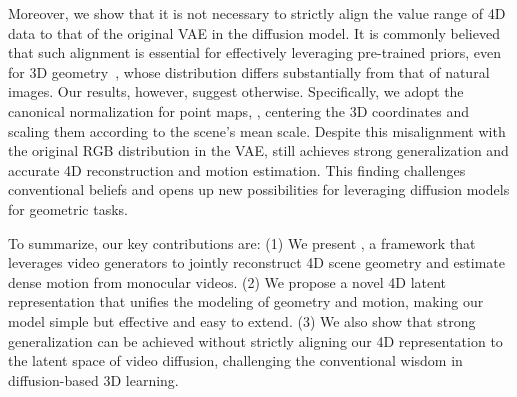 Moreover, we show that it is not necessary to strictly align the value range of 4D data to that of the original VAE in the diffusion model.
It is commonly believed that such alignment is essential for effectively leveraging pre-trained priors,
even for 3D geometry~\cite{ke2024repurposing,zhang2024world,lu2025matrix3d,jiang2025geo4d},
whose distribution differs substantially from that of natural images.
Our results, however, suggest otherwise.
Specifically, we adopt the canonical normalization for point maps,
\ie, centering the 3D coordinates and scaling them according to the scene's mean scale.
Despite this misalignment with the original RGB distribution in the VAE, \method{} still achieves strong generalization and accurate 4D reconstruction and motion estimation.
This finding challenges conventional beliefs and opens up new possibilities for leveraging diffusion models for geometric tasks.

To summarize, our key contributions are:
(1) We present \method,
a framework that leverages video generators to jointly reconstruct 4D scene geometry and estimate dense motion from monocular videos.
(2) We propose a novel 4D latent representation that unifies the modeling of geometry and motion, making our model simple but effective and easy to extend.
(3) We also show that strong generalization can be achieved without strictly aligning our 4D representation to the latent space of video diffusion,
challenging the conventional wisdom in diffusion-based 3D learning.


